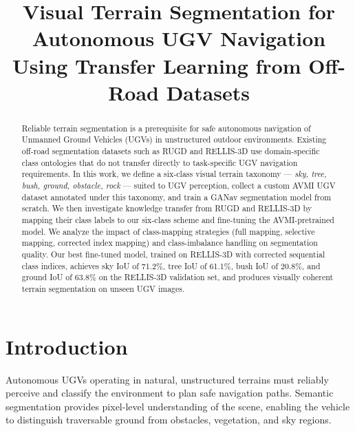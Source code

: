\documentclass[conference]{IEEEtran}
\begin{document}
\title{Visual Terrain Segmentation for Autonomous UGV Navigation Using Transfer Learning from Off-Road Datasets}

\author{
}

\maketitle

\begin{abstract}
Reliable terrain segmentation is a prerequisite for safe autonomous navigation of Unmanned Ground Vehicles (UGVs) in unstructured outdoor environments. Existing off-road segmentation datasets such as RUGD and RELLIS-3D use domain-specific class ontologies that do not transfer directly to task-specific UGV navigation requirements. In this work, we define a six-class visual terrain taxonomy — \textit{sky, tree, bush, ground, obstacle, rock} — suited to UGV perception, collect a custom AVMI UGV dataset annotated under this taxonomy, and train a GANav segmentation model from scratch. We then investigate knowledge transfer from RUGD and RELLIS-3D by mapping their class labels to our six-class scheme and fine-tuning the AVMI-pretrained model. We analyze the impact of class-mapping strategies (full mapping, selective mapping, corrected index mapping) and class-imbalance handling on segmentation quality. Our best fine-tuned model, trained on RELLIS-3D with corrected sequential class indices, achieves sky IoU of 71.2\%, tree IoU of 61.1\%, bush IoU of 20.8\%, and ground IoU of 63.8\% on the RELLIS-3D validation set, and produces visually coherent terrain segmentation on unseen UGV images.
\end{abstract}

\section{Introduction}

Autonomous UGVs operating in natural, unstructured terrains must reliably perceive and classify the environment to plan safe navigation paths. Semantic segmentation provides pixel-level understanding of the scene, enabling the vehicle to distinguish traversable ground from obstacles, vegetation, and sky regions.
\end{document}
